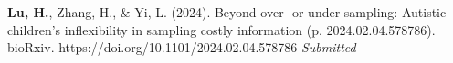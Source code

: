\newcommand{\Revision}{\textit{Under revision}}
\newcommand{\Review}{\textit{Under review}}
\newcommand{\Submitted}{\textit{Submitted}}
\newcommand{\Manuscript}{\textit{Preparing manuscript}}
\newcommand{\Preprint}{\textit{Preprint}}
\newcommand{\CS}{*} %
\newcommand{\CF}{\textsuperscript{\#}} %
\newcommand{\ME}{\textbf{Lu, H.}}


\begin{etaremune}
  \item \ME, Zhang, H., \& Yi, L. (2024). Beyond over- or under-sampling: Autistic children’s inflexibility in sampling costly information (p. 2024.02.04.578786). bioRxiv. https://doi.org/10.1101/2024.02.04.578786 \Submitted
\end{etaremune}
